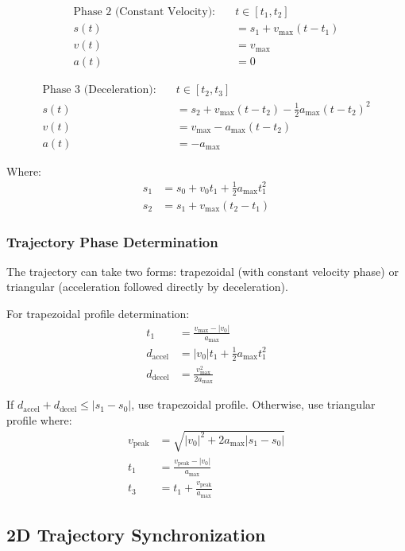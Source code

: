 \documentclass[12pt,a4paper]{article}
\begin{document}
\begin{align}
\text{Phase 2 (Constant Velocity):} \quad &t \in [t_1, t_2] \\
s(t) &= s_1 + v_{\max}(t - t_1) \\
v(t) &= v_{\max} \\
a(t) &= 0
\end{align}

\begin{align}
\text{Phase 3 (Deceleration):} \quad &t \in [t_2, t_3] \\
s(t) &= s_2 + v_{\max}(t - t_2) - \frac{1}{2}a_{\max}(t - t_2)^2 \\
v(t) &= v_{\max} - a_{\max}(t - t_2) \\
a(t) &= -a_{\max}
\end{align}

Where:
\begin{align}
s_1 &= s_0 + v_0 t_1 + \frac{1}{2}a_{\max}t_1^2 \\
s_2 &= s_1 + v_{\max}(t_2 - t_1)
\end{align}

\subsubsection{Trajectory Phase Determination}

The trajectory can take two forms: trapezoidal (with constant velocity phase) or triangular (acceleration followed directly by deceleration).

For trapezoidal profile determination:
\begin{align}
t_1 &= \frac{v_{\max} - |v_0|}{a_{\max}} \\
d_{\text{accel}} &= |v_0| t_1 + \frac{1}{2}a_{\max}t_1^2 \\
d_{\text{decel}} &= \frac{v_{\max}^2}{2a_{\max}}
\end{align}

If $d_{\text{accel}} + d_{\text{decel}} \leq |s_1 - s_0|$, use trapezoidal profile. Otherwise, use triangular profile where:
\begin{align}
v_{\text{peak}} &= \sqrt{|v_0|^2 + 2a_{\max}|s_1 - s_0|} \\
t_1 &= \frac{v_{\text{peak}} - |v_0|}{a_{\max}} \\
t_3 &= t_1 + \frac{v_{\text{peak}}}{a_{\max}}
\end{align}

\subsection{2D Trajectory Synchronization}
\end{document}

